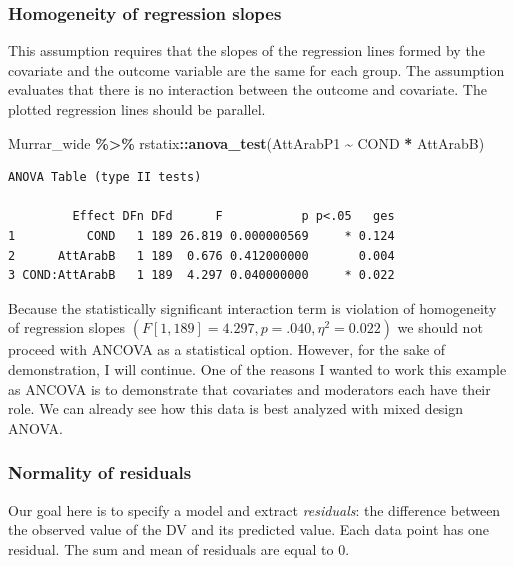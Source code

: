 \documentclass[
  11pt,
]{book}
\newenvironment{Shaded}{\begin{snugshade}}{\end{snugshade}}
\newcommand{\FunctionTok}[1]{\textcolor[rgb]{0.27,0.27,0.27}{\textbf{#1}}}
\newcommand{\NormalTok}[1]{#1}
\newcommand{\SpecialCharTok}[1]{\textcolor[rgb]{0.43,0.43,0.43}{\textbf{#1}}}
\begin{document}
\hypertarget{homogeneity-of-regression-slopes}{%
\subsubsection{Homogeneity of regression slopes}\label{homogeneity-of-regression-slopes}}

This assumption requires that the slopes of the regression lines formed by the covariate and the outcome variable are the same for each group. The assumption evaluates that there is no interaction between the outcome and covariate. The plotted regression lines should be parallel.

\begin{Shaded}
\begin{Highlighting}[]
\NormalTok{Murrar\_wide }\SpecialCharTok{\%\textgreater{}\%}
\NormalTok{    rstatix}\SpecialCharTok{::}\FunctionTok{anova\_test}\NormalTok{(AttArabP1 }\SpecialCharTok{\textasciitilde{}}\NormalTok{ COND }\SpecialCharTok{*}\NormalTok{ AttArabB)}
\end{Highlighting}
\end{Shaded}

\begin{verbatim}
ANOVA Table (type II tests)

         Effect DFn DFd      F           p p<.05   ges
1          COND   1 189 26.819 0.000000569     * 0.124
2      AttArabB   1 189  0.676 0.412000000       0.004
3 COND:AttArabB   1 189  4.297 0.040000000     * 0.022
\end{verbatim}

Because the statistically significant interaction term is violation of homogeneity of regression slopes \((F [1, 189] = 4.297, p = .040, \eta^2 = 0.022)\) we should not proceed with ANCOVA as a statistical option. However, for the sake of demonstration, I will continue. One of the reasons I wanted to work this example as ANCOVA is to demonstrate that covariates and moderators each have their role. We can already see how this data is best analyzed with mixed design ANOVA.

\hypertarget{normality-of-residuals}{%
\subsubsection{Normality of residuals}\label{normality-of-residuals}}

Our goal here is to specify a model and extract \emph{residuals}: the difference between the observed value of the DV and its predicted value. Each data point has one residual. The sum and mean of residuals are equal to 0.
\end{document}
